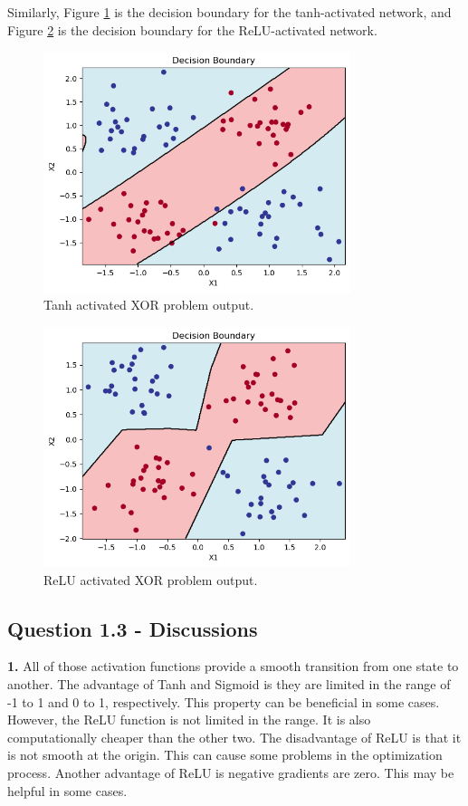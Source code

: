 \documentclass{assignment}
\begin{document}
Similarly, Figure \ref{fig:tanh_q1} is the decision boundary for the tanh-activated network, and Figure \ref{fig:relu_q1} is the decision boundary for the ReLU-activated network.


\begin{figure}[!htb]
    \centering
    \includegraphics[width=0.8\textwidth]{figures/q1_tanh.png}
    \caption{Tanh activated XOR problem output.}
    \label{fig:tanh_q1}
\end{figure}

\begin{figure}[!htb]
    \centering
    \includegraphics[width=0.8\textwidth]{figures/q1_relu.png}
    \caption{ReLU activated XOR problem output.}
    \label{fig:relu_q1}
\end{figure}

\subsection*{Question 1.3 - Discussions}
\textbf{1.}
All of those activation functions provide a smooth transition from one state to another. The advantage of Tanh and Sigmoid is they are limited in the range of -1 to 1 and 0 to 1, respectively. This property can be beneficial in some cases. However, the ReLU function is not limited in the range. It is also computationally cheaper than the other two. The disadvantage of ReLU is that it is not smooth at the origin. This can cause some problems in the optimization process. Another advantage of ReLU is negative gradients are zero. This may be helpful in some cases. 
\end{document}
